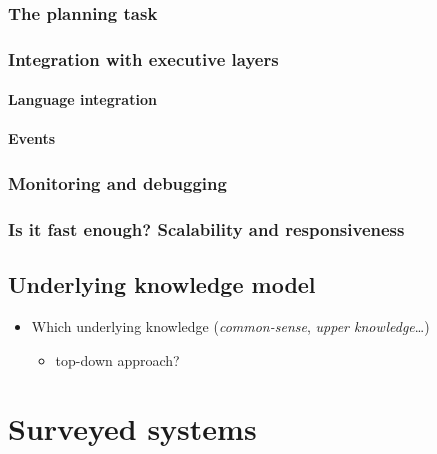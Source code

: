 \documentclass[a4paper, twocolumn]{article}
\begin{document}
\subsubsection{The planning task}

\subsubsection{Integration with executive layers}
\label{sect|integration-executive-layers}

\paragraph{Language integration}

\paragraph{Events}

\subsubsection{Monitoring and debugging}
\label{sect|debugging}

\subsubsection{Is it fast enough? Scalability and responsiveness}
\label{sect|scalability}


\subsection{Underlying knowledge model}

\begin{itemize}
	\item  Which underlying knowledge (\emph{common-sense}, \emph{upper knowledge}\ldots{})
	\begin{itemize}
		\item  top-down approach?
	\end{itemize}

\end{itemize}



\section{Surveyed systems}
\end{document}
